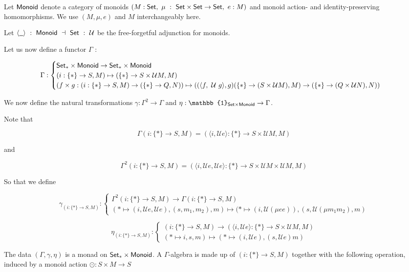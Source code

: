 Let $\mathsf{Monoid}$ denote a category of monoids $(M : \mathsf{Set},~ \mu~:~ \mathsf{Set} \times \mathsf{Set} \to \mathsf{Set},~ e : M)$
and monoid action- and identity-preserving homomorphisms. We use $(M, \mu, e)$ and $M$
interchangeably here.

Let $\langle \wcard \rangle ~:~\Monoid~\dashv ~\Set~ :~ \mathcal{U}$ be the free-forgetful adjunction
for monoids.

Let us now define a functor $\Gamma$ :

\[ \Gamma : \begin{cases}
  \mathsf{Set}_{*} \times \mathsf{Monoid} \to \mathsf{Set}_{*} \times \mathsf{Monoid}  \\
  (i : \{*\} \to S, M) \mapsto (\{*\} \to S \times \mathcal{U} M, M) \\
  (f \times g : (i : \{*\} \to S, M) \to (\{*\} \to Q, N)) \mapsto
    ((\langle f,~\mathcal{U}~g \rangle, g)  (\{*\} \to (S \times \mathcal{U} M), M) \to (\{*\} \to (Q \times \mathcal{U} N), N))
\end{cases} \]

We now define the natural transformations $\gamma : \Gamma^2 \to \Gamma$ and
$\eta : \mathbb{1}_{\Set \times \Monoid} \to \Gamma$.

Note that

\[ \Gamma (i : \{*\} \to S, M) = (\langle i, \mathcal{U} e\rangle : \{*\} \to S \times \mathcal{U} M, M) \]

and

\[\Gamma^2 (i : \{*\} \to S, M) =
(\langle i, \mathcal{U} e, \mathcal{U} e\rangle : \{*\} \to S \times \mathcal{U} M \times \mathcal{U} M, M) \]

So that we define

\[ \gamma_{(i : \{*\} \to S, M)} : \begin{cases}
   \Gamma^2 (i : \{*\} \to S, M) \to \Gamma (i : \{*\} \to S, M)
  \\
  (* \mapsto (i, \mathcal{U} e, \mathcal{U} e), (s, m_1, m_2), m) \mapsto (* \mapsto (i, \mathcal{U} (\mu e e)), (s, \mathcal{U} (\mu m_1 m_2), m)
\end{cases} \]

\[ \eta_{(i : \{*\} \to S, M)} : \begin{cases}
  (i : \{*\} \to S, M) \to (\langle i, \mathcal{U} e\rangle : \{*\} \to S \times \mathcal{U} M, M)  \\
  (* \mapsto i, s, m) \mapsto (* \mapsto (i, \mathcal{U} e), (s, \mathcal{U} e) m)
\end{cases} \]

The data $(\Gamma, \gamma, \eta)$ is a monad on $\mathsf{Set}_{*} \times \mathsf{Monoid}$. A $\Gamma$-algebra
is made up of $(i : \{*\} \to S, M)$ together with the following operation, induced
by a monoid action $\odot : S \times M \to S$

